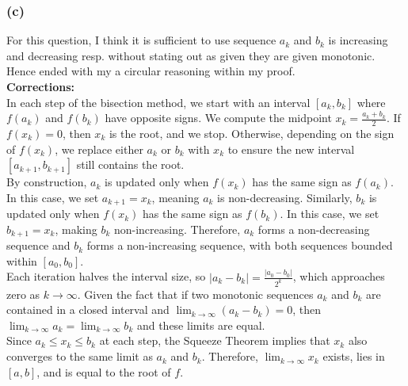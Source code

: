 \documentclass[12pt]{article}
\begin{document}
\subsubsection{(c)}
For this question, I think it is sufficient to use sequence $a_k$ and $b_k$ is increasing and decreasing resp. without stating out as given they are given monotonic. 
Hence ended with my a circular reasoning within my proof.
\\
\textbf{Corrections: }
\\
In each step of the bisection method, we start with an interval \( [a_k, b_k] \) where \( f(a_k) \) and \( f(b_k) \) have opposite signs. We compute the midpoint \( x_k = \frac{a_k + b_k}{2} \). If \( f(x_k) = 0 \), then \( x_k \) is the root, and we stop. Otherwise, depending on the sign of \( f(x_k) \), we replace either \( a_k \) or \( b_k \) with \( x_k \) to ensure the new interval \( [a_{k+1}, b_{k+1}] \) still contains the root.
\\
By construction, \( a_k \) is updated only when \( f(x_k) \) has the same sign as \( f(a_k) \). In this case, we set \( a_{k+1} = x_k \), meaning \( a_k \) is non-decreasing.
Similarly, \( b_k \) is updated only when \( f(x_k) \) has the same sign as \( f(b_k) \). In this case, we set \( b_{k+1} = x_k \), making \( b_k \) non-increasing.
Therefore, \( a_k \) forms a non-decreasing sequence and \( b_k \) forms a non-increasing sequence, with both sequences bounded within \( [a_0, b_0] \).
\\
Each iteration halves the interval size, so \( |a_k - b_k| = \frac{|a_0 - b_0|}{2^k} \), which approaches zero as \( k \to \infty \).
Given the fact that if two monotonic sequences \( a_k \) and \( b_k \) are contained in a closed interval and \( \lim_{k \to \infty} (a_k - b_k) = 0 \), then \( \lim_{k \to \infty} a_k = \lim_{k \to \infty} b_k \) and these limits are equal.
\\
Since \( a_k \leq x_k \leq b_k \) at each step, the Squeeze Theorem implies that \( x_k \) also converges to the same limit as \( a_k \) and \( b_k \).
Therefore, \( \lim_{k \to \infty} x_k \) exists, lies in \( [a, b] \), and is equal to the root of \( f \).
\end{document}
